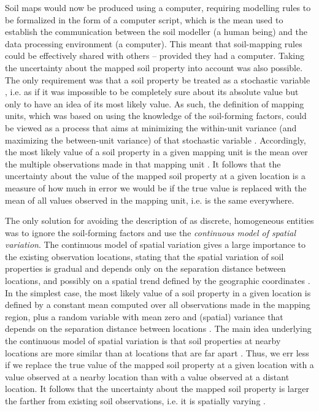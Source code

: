 Soil maps would now be produced using a computer, requiring modelling rules to be formalized in the
form of a computer script, which is the mean used to establish the communication between the soil
modeller (a human being) and the data processing environment (a computer). This meant that
soil-mapping rules could be effectively shared with others -- provided they had a computer. Taking the
uncertainty about the mapped soil property into account was also possible. The only requirement was that a
soil property be treated as a stochastic variable \cite{Cressie1993}, i.e. as if it was impossible to be
completely sure about its absolute value but only to have an idea of its most likely value. As such, the
definition of mapping units, which was based on using the knowledge of the soil-forming factors, could be
viewed as a process that aims at minimizing the within-unit variance (and maximizing the between-unit
variance) of that stochastic variable \cite{VoltzEtAl1990}. Accordingly, the most likely value of a
soil property in a given mapping unit is the mean over the multiple observations made in that
mapping unit \cite{VoltzEtAl1990,Cressie1993}. It follows that the uncertainty about the value of
the mapped soil property at a given location is a measure of how much in error we would be if the true
value is replaced with the mean of all values observed in the mapping unit, i.e. is the same
everywhere.

The only solution for avoiding the description of  as discrete, homogeneous entities
was to ignore the soil-forming factors and use the \emph{continuous model of spatial variation}.
The continuous model of spatial variation gives a large importance to the existing observation
locations, stating that the spatial variation of soil properties is gradual and depends only on the
separation distance between locations, and possibly on a spatial trend defined by the geographic
coordinates \cite{WebsterEtAl1990,Cressie1993}. In the simplest case, the most likely value of a
soil property in a given location is defined by a constant mean computed over all observations made
in the mapping region, plus a random variable with mean zero and (spatial) variance that depends on
the separation distance between locations \cite{Cressie1993}. The main idea underlying the
continuous model of spatial variation is that soil properties at nearby locations are more similar
than at locations that are far apart \cite{WebsterEtAl1990}. Thus, we err less if we replace the
true value of the mapped soil property at a given location with a value observed at a nearby
location than with a value observed at a distant location. It follows that the uncertainty about
the mapped soil property is larger the farther from existing soil observations, i.e. it is
spatially varying \cite{Cressie1993}.

